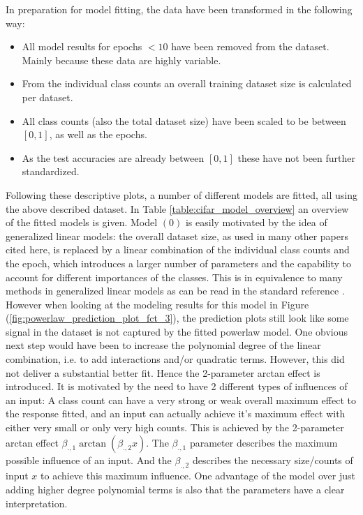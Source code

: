 \documentclass{article} %
\begin{document}
In preparation for model fitting, the data have been transformed in the following way:
\begin{itemize}
    \item All model results for epochs $< 10$ have been removed from the dataset. Mainly because these data are highly variable.
    \item From the individual class counts an overall training dataset size is calculated per dataset.
    \item All class counts (also the total dataset size) have been scaled to be between $[0, 1]$, as well as the epochs.
    \item As the test accuracies are already between $[0,1]$ these have not been further standardized.
\end{itemize}
Following these descriptive plots, a number of different models are fitted, all using the above described dataset.
In Table \ref{table:cifar_model_overview} an overview of the fitted models is given.
Model $(0)$ is easily motivated by the idea of generalized linear models: the overall dataset size, as used in many other papers cited here, is replaced by a linear combination of the individual class counts and the epoch, which introduces a larger number of parameters and the capability to account for different importances of the classes. 
This is in equivalence to many methods in generalized linear models as can be read in the standard reference \cite{GeneralizedLinearModels}.
However when looking at the modeling results for this model in Figure (\ref{fig:powerlaw_prediction_plot_fct_3}), the prediction plots still look like some signal in the dataset is not captured by the fitted powerlaw model.
One obvious next step would have been to increase the polynomial degree of the linear combination, i.e. to add interactions and/or quadratic terms. However, this did not deliver a substantial better fit.
Hence the 2-parameter arctan effect is introduced. It is motivated by the need to have 2 different types of influences of an input: 
A class count can have a very strong or weak overall maximum effect to the response fitted, and an input can actually achieve it's maximum effect with either very small or only very high counts.
This is achieved by the 2-parameter arctan effect $\beta_{., 1} \arctan{(\beta_{., 2} x)}$. The $\beta_{.,1}$ parameter describes the maximum possible influence of an input.
And the $\beta_{., 2}$ describes the necessary size/counts of input $x$ to achieve this maximum influence.
One advantage of the model over just adding higher degree polynomial terms is also that the parameters have a clear interpretation.
\end{document}
